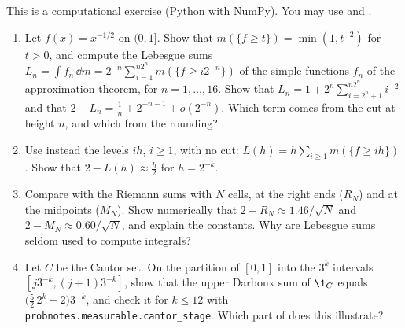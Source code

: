 \begin{exercise}\label{ex:ig-lebesgue-sums}
\medium This is a computational exercise (Python with NumPy). You may use
 and .
\begin{enumerate}[label=(\alph*)]
  \item Let $f(x)=x^{-1/2}$ on $(0,1]$. Show that $m(\{f\ge t\})=\min(1,t^{-2})$ for $t>0$, and
    compute the Lebesgue sums $L_n=\int f_n\,\dd m=2^{-n}\sum_{i=1}^{n2^n}m(\{f\ge i2^{-n}\})$ of the
    simple functions $f_n$ of the approximation theorem, for $n=1,\dots,16$. Show that
    $L_n=1+2^n\sum_{i=2^n+1}^{n2^n}i^{-2}$ and that $2-L_n=\frac1n+2^{-n-1}+o(2^{-n})$. Which
    term comes from the cut at height $n$, and which from the rounding?
  \item Use instead the levels $ih$, $i\ge1$, with no cut: $L(h)=h\sum_{i\ge1}m(\{f\ge ih\})$.
    Show that $2-L(h)\approx\frac h2$ for $h=2^{-k}$.
  \item Compare with the Riemann sums with $N$ cells, at the right ends ($R_N$) and at the
    midpoints ($M_N$). Show numerically that $2-R_N\approx1.46/\sqrt N$ and $2-M_N\approx0.60/\sqrt
    N$, and explain the constants. Why are Lebesgue sums seldom used to compute integrals?
  \item Let $C$ be the Cantor set. On the partition of $[0,1]$ into the $3^k$ intervals
    $[j3^{-k},(j+1)3^{-k}]$, show that the upper Darboux sum of $\1_C$ equals
    $\big(\frac52\,2^k-2\big)3^{-k}$, and check it for $k\le12$ with
    \texttt{probnotes.measurable.cantor\_stage}. Which part of  does this
    illustrate?
\end{enumerate}
\end{exercise}
